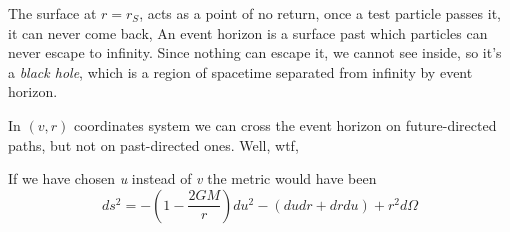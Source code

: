 \bigskip

The surface at $r=r_{S}$, acts as a point of no return, once a test particle passes it, it can never come back, An event horizon  is a surface past which particles can never escape to infinity. Since nothing can escape it, we cannot see inside, so it's a \emph{black hole}, which is a region of spacetime separated from infinity by event horizon.\par

In $\left( v,r \right)$ coordinates system we can cross the event horizon on future-directed paths, but not on past-directed ones. Well, wtf,\par
If we have chosen \emph{u} instead of \emph{v} the metric would have been
\begin{equation}
ds^{2} = - \left( 1 - \frac{2GM}{r} \right)du^{2} - \left(  dudr + drdu \right) + r^{2}d\Omega 
\end{equation}


